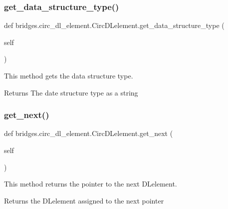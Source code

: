 \subsubsection{\texorpdfstring{get\+\_\+data\+\_\+structure\+\_\+type()}{get\_data\_structure\_type()}}
{\footnotesize\ttfamily def bridges.\+circ\+\_\+dl\+\_\+element.\+Circ\+D\+Lelement.\+get\+\_\+data\+\_\+structure\+\_\+type (\begin{DoxyParamCaption}\item[{}]{self }\end{DoxyParamCaption})}



This method gets the data structure type. 

\begin{DoxyReturn}{Returns}
The date structure type as a string 
\end{DoxyReturn}
\mbox{\label{classbridges_1_1circ__dl__element_1_1_circ_d_lelement_a7a0432dd9694cb389db12a0027af04cc}} 
\subsubsection{\texorpdfstring{get\+\_\+next()}{get\_next()}}
{\footnotesize\ttfamily def bridges.\+circ\+\_\+dl\+\_\+element.\+Circ\+D\+Lelement.\+get\+\_\+next (\begin{DoxyParamCaption}\item[{}]{self }\end{DoxyParamCaption})}



This method returns the pointer to the next D\+Lelement. 

\begin{DoxyReturn}{Returns}
the D\+Lelement assigned to the next pointer 
\end{DoxyReturn}
\mbox{\label{classbridges_1_1circ__dl__element_1_1_circ_d_lelement_ab22f5daaddd55928455e0d85e88a6c03}} 

